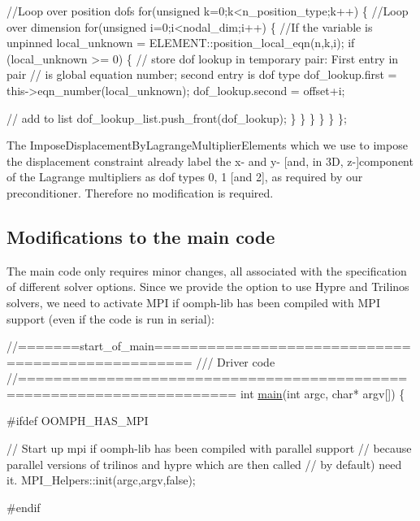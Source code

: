 \begin{DoxyCodeInclude}
     \textcolor{comment}{//Loop over position dofs}
     \textcolor{keywordflow}{for}(\textcolor{keywordtype}{unsigned} k=0;k<n\_position\_type;k++)
      \{
       \textcolor{comment}{//Loop over dimension}
       \textcolor{keywordflow}{for}(\textcolor{keywordtype}{unsigned} i=0;i<nodal\_dim;i++)
        \{
         \textcolor{comment}{//If the variable is unpinned}
         local\_unknown = ELEMENT::position\_local\_eqn(n,k,i);
         \textcolor{keywordflow}{if} (local\_unknown >= 0)
          \{
           \textcolor{comment}{// store dof lookup in temporary pair: First entry in pair}
           \textcolor{comment}{// is global equation number; second entry is dof type}
           dof\_lookup.first = this->eqn\_number(local\_unknown);
           dof\_lookup.second = offset+i;
           
           \textcolor{comment}{// add to list}
           dof\_lookup\_list.push\_front(dof\_lookup);
          \}
        \}
      \}
    \}
  \}
\};

\end{DoxyCodeInclude}


The {\ttfamily Impose\+Displacement\+By\+Lagrange\+Multiplier\+Elements} which we use to impose the displacement constraint already label the x-\/ and y-\/ \mbox{[}and, in 3D, z-\/\mbox{]}component of the Lagrange multipliers as dof types 0, 1 \mbox{[}and 2\mbox{]}, as required by our preconditioner. Therefore no modification is required.



\hypertarget{index_driver}{}\subsection{Modifications to the main code}\label{index_driver}
The main code only requires minor changes, all associated with the specification of different solver options. Since we provide the option to use Hypre and Trilinos solvers, we need to activate M\+PI if {\ttfamily oomph-\/lib} has been compiled with M\+PI support (even if the code is run in serial)\+:

 
\begin{DoxyCodeInclude}
\textcolor{comment}{//=======start\_of\_main==================================================}
\textcolor{comment}{/// Driver code}
\textcolor{comment}{}\textcolor{comment}{//======================================================================}
\textcolor{keywordtype}{int} \hyperlink{prescribed__displ__lagr__mult_8cc_ae66f6b31b5ad750f1fe042a706a4e3d4}{main}(\textcolor{keywordtype}{int} argc, \textcolor{keywordtype}{char}* argv[])
\{


\textcolor{preprocessor}{#ifdef OOMPH\_HAS\_MPI}

 \textcolor{comment}{// Start up mpi if oomph-lib has been compiled with parallel support}
 \textcolor{comment}{// because parallel versions of trilinos and hypre which are then called}
 \textcolor{comment}{// by default) need it.}
 MPI\_Helpers::init(argc,argv,\textcolor{keyword}{false});

\textcolor{preprocessor}{#endif}

\end{DoxyCodeInclude}


